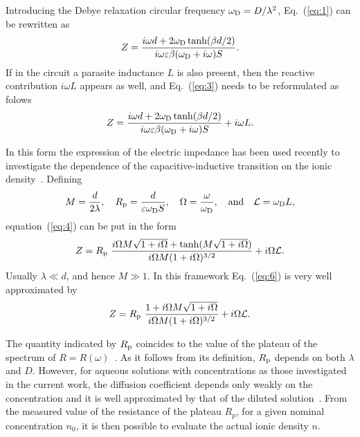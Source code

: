 \documentclass[preprint,aps,pre]{revtex4}
\begin{document}
Introducing the Debye relaxation circular frequency $\omega_{\rm D}=D/\lambda^2$, Eq.~(\ref{eq:1}) can be rewritten as
\begin{equation}
\label{eq:3}Z=\frac{i \omega d+2 \omega_{\rm D} \tanh (\beta d/2)}{i \omega \varepsilon \beta (\omega_{\rm D}+ i \omega)S}.
\end{equation}
If in the circuit a parasite inductance $L$ is also present, then the  reactive contribution $i \omega L$ appears as well, and Eq.~(\ref{eq:3}) needs to be reformulated as  folows
\begin{equation}
\label{eq:4}Z=\frac{i \omega d+2 \omega_{\rm D} \tanh (\beta d/2)}{i \omega \varepsilon \beta (\omega_{\rm D}+ i \omega)S}+i \omega L.
\end{equation}

In this form the expression of the electric impedance has been used recently to investigate the dependence of the capacitive-inductive transition on the ionic density~\cite{JML}. Defining
\begin{equation}
\label{eq:5}M=\frac{d}{2 \lambda},\quad R_{\rm p}=\frac{d}{\varepsilon \omega_{\rm D} S},\quad \Omega=\frac{\omega}{\omega_{\rm D}},\quad{\rm and}\quad {\cal L}=\omega_{\rm D} L,
\end{equation}
equation~(\ref{eq:4}) can be put in the form
\begin{equation}
\label{eq:6} Z=R_{\rm p}\,\,\frac{i \Omega M \sqrt{1+i \Omega}+\tanh(M \sqrt{1+ i \Omega})}{i \Omega M (1+i \Omega)^{3/2}}+i \Omega {\cal L}.
\end{equation}
Usually $\lambda\ll d$, and hence $M\gg 1$. In this framework Eq.~(\ref{eq:6}) is very well approximated by
\begin{equation}
\label{eq:7} Z=R_{\rm p}\,\,\frac{1+i \Omega M \sqrt{1+i \Omega}}{i \Omega M (1+i \Omega)^{3/2}}+i \Omega {\cal L}.
\end{equation}

The quantity indicated by $R_{\rm p}$ coincides to the value of the plateau of the spectrum of $R = R(\omega)$~\cite{alai}. As it follows from its definition, $R_{\rm p}$ depends on both $\lambda$ and $D$. However, for aqueous solutions with concentrations as those investigated in the current work, the diffusion coefficient depends only weakly on the concentration and it is well approximated by that of the diluted solution~\cite{atkins}. From the measured value of the resistance of the plateau $R_p$, for a given nominal concentration $n_0$, it is then possible to evaluate the actual ionic density $n$.
\end{document}
